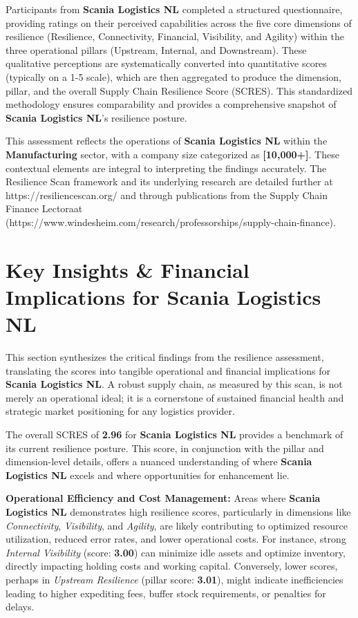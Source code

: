 \documentclass[
  oneside,
  open=any,
  fontsize=11pt]{scrbook}
\begin{document}
Participants from \textbf{Scania Logistics NL} completed a structured
questionnaire, providing ratings on their perceived capabilities across
the five core dimensions of resilience (Resilience, Connectivity,
Financial, Visibility, and Agility) within the three operational pillars
(Upstream, Internal, and Downstream). These qualitative perceptions are
systematically converted into quantitative scores (typically on a 1-5
scale), which are then aggregated to produce the dimension, pillar, and
the overall Supply Chain Resilience Score (SCRES). This standardized
methodology ensures comparability and provides a comprehensive snapshot
of \textbf{Scania Logistics NL}'s resilience posture.

This assessment reflects the operations of \textbf{Scania Logistics NL}
within the \textbf{Manufacturing} sector, with a company size
categorized as \textbf{{[}10,000+{]}}. These contextual elements are
integral to interpreting the findings accurately. The Resilience Scan
framework and its underlying research are detailed further at
https://resiliencescan.org/ and through publications from the Supply
Chain Finance Lectoraat
(https://www.windesheim.com/research/professorships/supply-chain-finance).

\chapter{Key Insights \& Financial Implications for Scania Logistics
NL}\label{key-insights-financial-implications-for-scania-logistics-nl}

This section synthesizes the critical findings from the resilience
assessment, translating the scores into tangible operational and
financial implications for \textbf{Scania Logistics NL}. A robust supply
chain, as measured by this scan, is not merely an operational ideal; it
is a cornerstone of sustained financial health and strategic market
positioning for any logistics provider.

The overall SCRES of \textbf{2.96} for \textbf{Scania Logistics NL}
provides a benchmark of its current resilience posture. This score, in
conjunction with the pillar and dimension-level details, offers a
nuanced understanding of where \textbf{Scania Logistics NL} excels and
where opportunities for enhancement lie.

\textbf{Operational Efficiency and Cost Management:} Areas where
\textbf{Scania Logistics NL} demonstrates high resilience scores,
particularly in dimensions like \emph{Connectivity}, \emph{Visibility},
and \emph{Agility}, are likely contributing to optimized resource
utilization, reduced error rates, and lower operational costs. For
instance, strong \emph{Internal Visibility} (score: \textbf{3.00}) can
minimize idle assets and optimize inventory, directly impacting holding
costs and working capital. Conversely, lower scores, perhaps in
\emph{Upstream Resilience} (pillar score: \textbf{3.01}), might indicate
inefficiencies leading to higher expediting fees, buffer stock
requirements, or penalties for delays.
\end{document}
